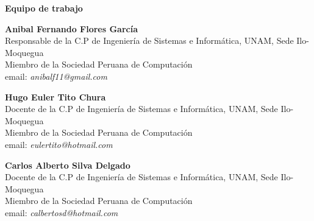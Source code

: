 \begin{center}
{\bf \Huge Equipo de trabajo}
\end{center}
\vspace{1cm}

\begin{center}
\textbf{Anibal Fernando Flores García}\\
Responsable de la C.P de Ingeniería de Sistemas e Informática, UNAM, Sede Ilo-Moquegua\\
Miembro de la Sociedad Peruana de Computación\\
email: \textit{anibalf11@gmail.com}\\
\end{center}

\begin{center}
\textbf{Hugo Euler Tito Chura}\\
Docente de la C.P de Ingeniería de Sistemas e Informática, UNAM, Sede Ilo-Moquegua\\
Miembro de la Sociedad Peruana de Computación\\
email: \textit{eulertito@hotmail.com}\\
\end{center}

\begin{center}
\textbf{Carlos Alberto Silva Delgado}\\
Docente de la C.P de Ingeniería de Sistemas e Informática, UNAM, Sede Ilo-Moquegua\\
Miembro de la Sociedad Peruana de Computación\\
email: \textit{calbertosd@hotmail.com}\\
\end{center}

